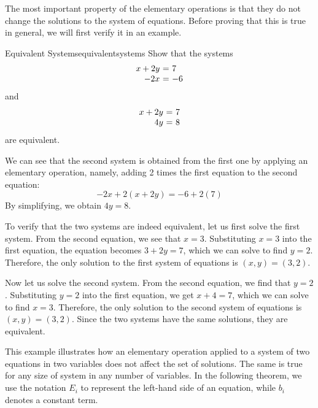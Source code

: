 The most important property of the elementary operations is that they
do not change the solutions to the system of equations. Before proving
that this is true in general, we will first verify it in an example.

\begin{example}{Equivalent Systems}{equivalentsystems}
Show that the systems
\begin{equation*}
\begin{array}{r@{~}c@{~}l}
x+2y&=&7 \\
-2x  &=& -6
\end{array}
\end{equation*}
and 
\begin{equation*}
\begin{array}{r@{~}c@{~}l}
x+2y&=&7 \\
4y &=& 8
\end{array}
\end{equation*}
are equivalent.
\end{example}

\begin{solution}
  We can see that the second system is obtained from the first one by
  applying an elementary operation, namely, adding 2 times the first
  equation to the second equation:
  \begin{equation*}
      -2x + 2(x+2y) = -6 + 2(7)
  \end{equation*}
  By simplifying, we obtain $4y = 8$.

  To verify that the two systems are indeed equivalent, let us first
  solve the first system. From the second equation, we see that
  $x=3$. Substituting $x=3$ into the first equation, the equation
  becomes $3+2y=7$, which we can solve to find $y=2$. Therefore, the
  only solution to the first system of equations is $(x,y) = (3,2)$.

  Now let us solve the second system. From the second equation, we
  find that $y=2$. Substituting $y=2$ into the first equation, we get
  $x+4=7$, which we can solve to find $x=3$. Therefore, the only
  solution to the second system of equations is $(x,y) = (3,2)$.
  Since the two systems have the same solutions, they are equivalent.
\end{solution}

This example illustrates how an elementary operation applied to a
system of two equations in two variables does not affect the set of
solutions. The same is true for any size of system in any number of
variables.  In the following theorem, we use the notation $E_i$ to
represent the left-hand side of an equation, while $b_i$ denotes a
constant term.

